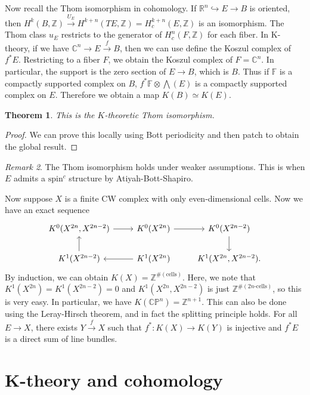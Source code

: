 \documentclass[leqno, openany]{memoir}
\newtheorem{thm}{Theorem}[section]
\theoremstyle{definition}
\theoremstyle{remark}
\newtheorem{rmk}[thm]{Remark}
\theoremstyle{plain}
\theoremstyle{definition}
\theoremstyle{remark}
\newcommand{\R}{\mathbb{R}}
\newcommand{\C}{\mathbb{C}}
\newcommand{\Z}{\mathbb{Z}}
\newcommand{\F}{\mathbb{F}}
\renewcommand{\P}{\mathbb{P}}
\newcommand{\mr}[1]{\mathrm{#1}}
\begin{document}
Now recall the Thom isomorphism in cohomology. If $\R^n \hookrightarrow E \to B$ is oriented, then $H^k(B, \Z) \xrightarrow{U_E} H^{k+n}(TE, \Z) = H_c^{k+n}(E, \Z)$ is an isomorphism. The Thom class $u_E$ restricts to the generator of $H^n_c(F, \Z)$ for each fiber. In K-theory, if we have $\C^n \to E \xrightarrow{f} B$, then we can use define the Koszul complex of $f^* E$. Restricting to a fiber $F$, we obtain the Koszul complex of $F = \C^n$. In particular, the support is the zero section of $E \to B$, which is $B$. Thus if $\F$ is a compactly supported complex on $B$, $f^* \F \otimes \bigwedge(E)$ is a compactly supported complex on $E$. Therefore we obtain a map $K(B) \simeq K(E)$.

\begin{thm}
    This is the $K$-theoretic Thom isomorphism.
\end{thm}

\begin{proof}
    We can prove this locally using Bott periodicity and then patch to obtain the global result.
\end{proof}

\begin{rmk}
    The Thom isomorphism holds under weaker assumptions. This is when $E$ admits a $\mr{spin}^c$ structure by Atiyah-Bott-Shapiro.
\end{rmk}

Now suppose $X$ is a finite CW complex with only even-dimensional cells. Now we have an exact sequence
\begin{equation*}
\begin{tikzcd}
    K^0(X^{2n}, X^{2n-2}) \ar{r} & K^0(X^{2n}) \ar{r} & K^0(X^{2n-2}) \ar{d} \\
    K^1(X^{2n-2}) \ar{u} & K^1(X^{2n}) \ar{l} & K^1(X^{2n}, X^{2n-2}).
\end{tikzcd}
\end{equation*}
By induction, we can obtain $K(X) = \Z^{\#(\text{cells})}$. Here, we note that $K^1(X^{2n}) = K^1(X^{2n-2}) = 0$ and $K^1(X^{2n}, X^{2n-2})$ is just $\Z^{\#(\text{$2n$-cells})}$, so this is very easy. In particular, we have $K(\C\P^n) = \Z^{n+1}$. This can also be done using the Leray-Hirsch theorem, and in fact the splitting principle holds. For all $E \to X$, there exists $Y \xrightarrow{f} X$ such that $f^* \colon K(X) \to K(Y)$ is injective and $f^* E$ is a direct sum of line bundles.

\section{K-theory and cohomology}%
\label{sec:k_theory_and_cohomology}
\end{document}
